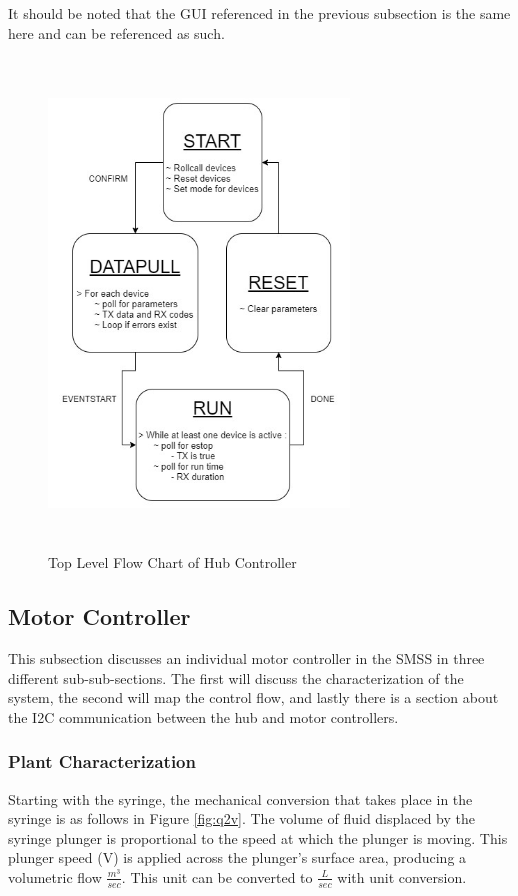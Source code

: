 \documentclass[journal]{IEEEtran}
\begin{document}
            It should be noted that the GUI referenced in the previous subsection is the same here and can be referenced as such. 
            
            \begin{figure}[H]
                \centering
                \includegraphics[width= 8cm, height = 13cm]{hub_L0}
                \caption{Top Level Flow Chart of Hub Controller}
                \label{fig:hub0}
            \end{figure}
            
            
        
    \subsection{Motor Controller}
        This subsection discusses an individual motor controller in the SMSS in three different sub-sub-sections. The first will discuss the characterization of the system, the second will map the control flow, and lastly there is a section about the I2C communication between the hub and motor controllers.
        
            \subsubsection{Plant Characterization}
                Starting with the syringe, the mechanical conversion that takes place in the syringe is as follows in Figure \ref{fig:q2v}. The volume of fluid displaced by the syringe plunger is proportional to the speed at which the plunger is moving. This plunger speed (V) is applied across the plunger's surface area, producing a volumetric flow \( \frac{m^3}{sec}\). This unit can be converted to \( \frac{L}{sec}\) with unit conversion.
                
\end{document}
